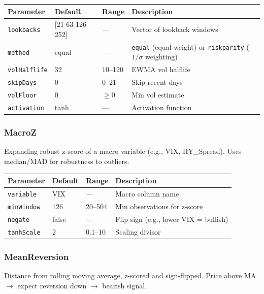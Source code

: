 \documentclass[11pt,a4paper]{article}
\begin{document}
\begin{center}
\begin{tabularx}{\textwidth}{l l l X}
\toprule
\textbf{Parameter} & \textbf{Default} & \textbf{Range} & \textbf{Description} \\
\midrule
\texttt{lookbacks} & {[}21 63 126 252{]} & --- & Vector of lookback windows \\
\texttt{method} & equal & --- & \texttt{equal} (equal weight) or \texttt{riskparity} ($1/\sigma$ weighting) \\
\texttt{volHalflife} & 32 & 10--120 & EWMA vol halflife \\
\texttt{skipDays} & 0 & 0--21 & Skip recent days \\
\texttt{volFloor} & 0 & $\geq 0$ & Min vol estimate \\
\texttt{activation} & tanh & --- & Activation function \\
\bottomrule
\end{tabularx}
\end{center}

\subsubsection{MacroZ}
Expanding robust z-score of a macro variable (e.g., VIX, HY\_Spread). Uses median/MAD for robustness to outliers.

\begin{center}
\begin{tabularx}{\textwidth}{l l l X}
\toprule
\textbf{Parameter} & \textbf{Default} & \textbf{Range} & \textbf{Description} \\
\midrule
\texttt{variable} & VIX & --- & Macro column name \\
\texttt{minWindow} & 126 & 20--504 & Min observations for z-score \\
\texttt{negate} & false & --- & Flip sign (e.g., lower VIX = bullish) \\
\texttt{tanhScale} & 2 & 0.1--10 & Scaling divisor \\
\bottomrule
\end{tabularx}
\end{center}

\subsubsection{MeanReversion}
Distance from rolling moving average, z-scored and sign-flipped. Price above MA $\rightarrow$ expect reversion down $\rightarrow$ bearish signal.
\end{document}
